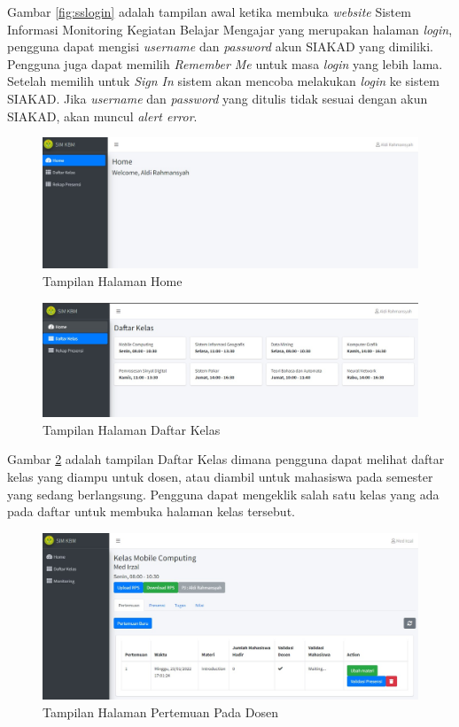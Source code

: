 Gambar \ref{fig:sslogin} adalah tampilan awal ketika membuka \textit{website} Sistem Informasi Monitoring Kegiatan Belajar Mengajar yang merupakan halaman \textit{login}, pengguna dapat mengisi \textit{username} dan \textit{password} akun SIAKAD yang dimiliki. Pengguna juga dapat memilih \textit{Remember Me} untuk masa \textit{login} yang lebih lama. Setelah memilih untuk \textit{Sign In} sistem akan mencoba melakukan \textit{login} ke sistem SIAKAD. Jika \textit{username} dan \textit{password} yang ditulis tidak sesuai dengan akun SIAKAD, akan muncul \textit{alert error}.

\begin{figure}[h!]
	\centering
	\includegraphics[width=1\textwidth]{gambar/ss/home_mahasiswa}
	\caption{Tampilan Halaman Home}
	\label{fig:sshome}
\end{figure}

\begin{figure}[h!]
	\centering
	\includegraphics[width=1\textwidth]{gambar/ss/daftar_kelas}
	\caption{Tampilan Halaman Daftar Kelas}
	\label{fig:ssdaftarkelas}
\end{figure}

Gambar \ref{fig:ssdaftarkelas} adalah tampilan Daftar Kelas dimana pengguna dapat melihat daftar kelas yang diampu untuk dosen, atau diambil untuk mahasiswa pada semester yang sedang berlangsung. Pengguna dapat mengeklik salah satu kelas yang ada pada daftar untuk membuka halaman kelas tersebut.

\begin{figure}[h!]
	\centering
	\includegraphics[width=1\textwidth]{gambar/ss/kelas_dosen}
	\caption{Tampilan Halaman Pertemuan Pada Dosen}
	\label{fig:ssform05dosen}
\end{figure}

